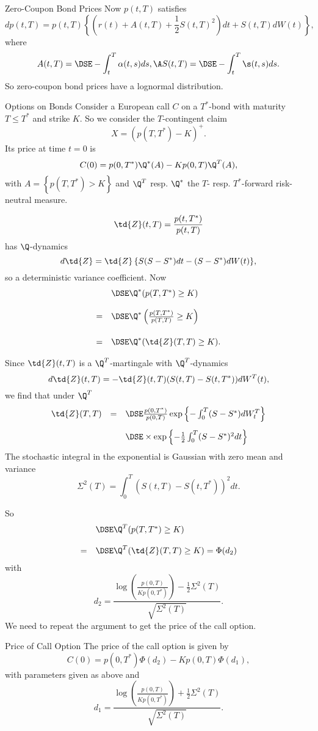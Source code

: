 Zero-Coupon Bond Prices
	Now $p(t,T)$ satisfies
		$$
		dp(t,T) = p(t,T) \left\{\left(r(t) + A(t,T) + \frac{1}{2}
		S(t,T)^2 \right)dt + S(t,T) dW(t)\right\},
		$$
	where
		$$
		A(t,T) =\DSE -\int_t^T \alpha(t,s) ds, \A S(t,T) =\DSE -\int_t^T
		\s(t,s) ds.
		$$
	So zero-coupon bond prices have a lognormal distribution.


Options on Bonds
	Consider a European call $C$ on a
	$T^*$-bond with maturity $T \leq T^*$ and strike $K$. So we
	consider the $T$-contingent claim
		$$
		X = \left(p(T,T^*)-K\right)^+\!\!.
		$$
	Its price at time $t=0$ is
		$$
		C(0) = p(0,T^*) \Q^*(A) -K p(0,T) \Q^T(A),
		$$
	with $A= \left\{p(T,T^*) >K\right\}$ and $\Q^T$ resp.
	$\Q^*$ the $T$- resp. $T^*$-forward risk-neutral measure.

		$$
		\td{Z}(t,T) = \frac{p(t,T^*)}{p(t,T)}
		$$
	has $\Q$-dynamics
		$$
		d \td{Z} = \td{Z} \left\{ S(S-S^*)  dt -(S-S^*) dW
		(t)\right\}\!,
		$$
	so a deterministic variance coefficient. Now
		$$
		\begin{array}{ll}
		&\DSE \Q^*(p(T,T^*) \geq K)\\*[12pt]
		=&\DSE \Q^*\left(\frac{p(T,T^*)}{p(T,T)} \geq
		K\right)\\*[18pt]
		=&\DSE \Q^*(\td{Z}(T,T) \geq K).
		\end{array}
		$$
	
	Since $\td{Z}(t,T)$ is a $\Q^T$-martingale with $\Q^T$-dynamics
		$$
		d \td{Z}(t,T) = - \td{Z}(t,T)  (S(t,T)-S(t,T^*)) d W^T(t),
		$$
	we find that under $\Q^T$
		$$
		\begin{array}{lll}
		\td{Z}(T,T) &=&\DSE  \frac{p(0,T^*)}{p(0,T)} \exp\left\{-\int_0^T (S-S^*)
		dW^T_t \right\} \\*[12pt]
		&&\DSE \times\exp\left\{- \frac{1}{2} \int_0^T (S-S^*)^2 d t\right\}
		\end{array}
		$$
	The stochastic integral in
	the exponential is Gaussian with zero mean and variance
		$$
		\Sigma^2(T) = \int_0^T (S(t,T)-S(t,T^*))^2 dt.
		$$
	
	So
		$$\begin{array}{ll}
		&\DSE \Q^T(p(T,T^*) \geq K) \\*[12pt]
		=&\DSE \Q^T(\td{Z}(T,T) \geq K) = \Phi(d_2)
		\end{array}
		$$
	with
		$$
		d_2 = \frac{\log\left(\frac{p(0,T)}{K p(0,T^*)}\right) -
		\frac{1}{2} \Sigma^2(T)}{\sqrt{\Sigma^2(T)}}.
		$$
	We need to repeat the argument to get the price of the call option.


Price of Call Option
	The price of the call option is given by
		$$
		C(0) = p(0,T^*)\Phi(d_2) - K p(0,T)\Phi(d_1),
		$$
	with parameters given as above  and
		$$
		d_1 = \frac{\log\left(\frac{p(0,T)}{K p(0,T^*)}\right) +
		\frac{1}{2} \Sigma^2(T)}{\sqrt{\Sigma^2(T)}}.
		$$


